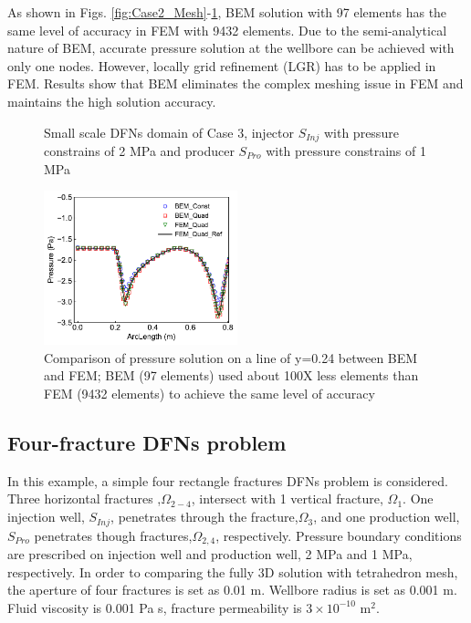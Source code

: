 \documentclass[num-refs]{wiley-networks}
\begin{document}
As shown in Figs. \ref{fig:Case2_Mesh}-\ref{fig:Case2_PressureOverLine}, BEM solution with 97 elements has the same level of accuracy in FEM with 9432 elements. Due to the semi-analytical nature of BEM, accurate pressure solution at the wellbore can be achieved with only one nodes. However, locally grid refinement (LGR) has to be applied in FEM. Results show that BEM eliminates the complex meshing issue in FEM and maintains the high solution accuracy.

\begin{figure}[h!]
\caption{Small scale DFNs domain of Case 3, injector $S_{Inj}$ with pressure constrains of 2 MPa and producer $S_{Pro}$ with pressure constrains of 1 MPa}
\centering
\includegraphics[width=0.5\textwidth]{Case2_PressureOverLine.pdf}
\caption{Comparison of pressure solution on a line of y=0.24 between BEM and FEM; BEM (97 elements) used about 100X less elements than FEM (9432 elements) to achieve the same level of accuracy}
\label{fig:Case2_PressureOverLine}
\end{figure}

\subsection{Four-fracture DFNs problem}
In this example, a simple four rectangle fractures DFNs problem is considered. Three horizontal fractures ,$\Omega_{2-4}$, intersect with 1 vertical fracture, $\Omega_{1}$. One injection well, $S_{Inj}$, penetrates through the fracture,$\Omega_{3}$, and one production well, $S_{Pro}$ penetrates though fractures,$\Omega_{2,4}$, respectively. Pressure boundary conditions are prescribed on injection well and production well, 2 MPa and 1 MPa, respectively. In order to comparing the fully 3D solution with tetrahedron mesh, the aperture of four fractures is set as 0.01 m. Wellbore radius is set as 0.001 m. Fluid viscosity is 0.001 Pa s, fracture permeability is $3\times 10^{-10}\,\,\text{m}^2$.
\end{document}
